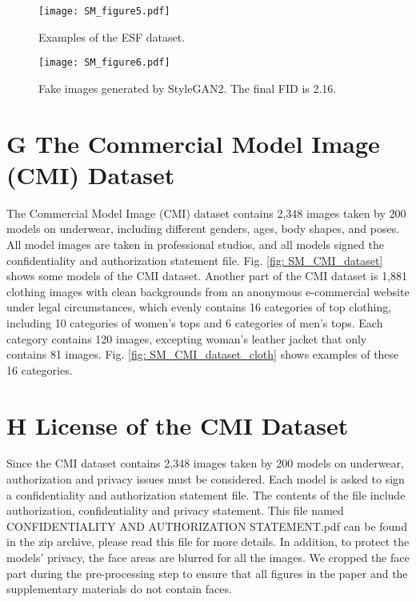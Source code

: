 \documentclass[10pt,twocolumn,letterpaper]{article}
\begin{document}
\begin{figure}[h]
  \centering
  \texttt{[image: SM\_figure5.pdf]}
  \caption{Examples of the ESF dataset.}\label{fig: SM_ESF}
\end{figure}

\begin{figure}[h]
  \centering
  \texttt{[image: SM\_figure6.pdf]}
  \caption{Fake images generated by StyleGAN2. The final FID is 2.16.}\label{fig: SM_fake_img}
\end{figure}


\section*{G The Commercial Model Image (CMI) Dataset}
The Commercial Model Image (CMI) dataset contains 2,348 images taken by 200 models on
underwear, including different genders, ages, body shapes,
and poses. All model images are taken in professional studios, and all models signed the confidentiality and authorization statement file. Fig. \ref{fig: SM_CMI_dataset} shows some models of the CMI dataset.
Another part of the CMI dataset is 1,881 clothing images with clean backgrounds from an anonymous e-commercial website under legal circumstances, which evenly contains 16 categories of top clothing, including 10 categories of women's tops and 6 categories of men's tops. Each category contains 120 images, excepting woman's leather jacket that only contains 81 images. 
Fig. \ref{fig: SM_CMI_dataset_cloth} shows examples of these 16 categories.

\section*{H License of the CMI Dataset}
Since the CMI dataset contains 2,348 images taken by 200 models on underwear, authorization and privacy issues must be considered. Each model is asked to sign a confidentiality and authorization statement file.
The contents of the file include authorization, confidentiality and privacy statement. This file named CONFIDENTIALITY AND AUTHORIZATION STATEMENT.pdf can be found in the zip archive, please read this file for more details.
In addition, to protect the models' privacy, the face areas are blurred for all the images. We cropped the face part during the pre-processing step to ensure that all figures in the paper and the supplementary materials do not contain faces.
\end{document}

